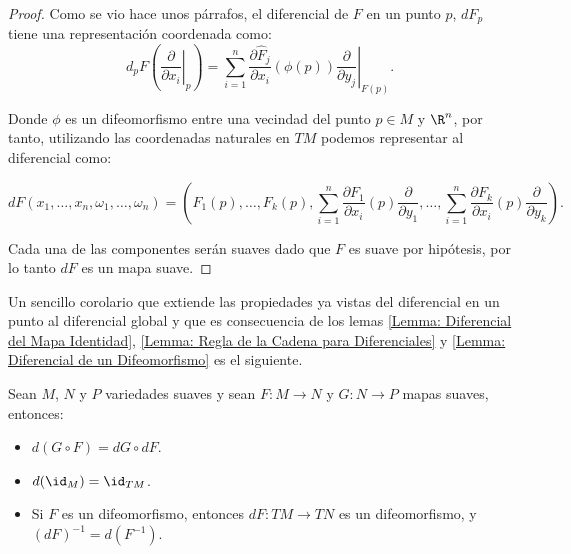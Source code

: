 \begin{proof}
	Como se vio hace unos párrafos, el diferencial de $F$ en un punto $p$, $dF_p$ tiene una representación coordenada como:
	\[
		d_{p}F \left( \left. \frac{\partial}{\partial x_i} \right|_{p}\right)
		=
		\sum_{i=1}^{n} \frac{\partial \hat{F}_j}{\partial x_i} (\phi(p)) \left. \frac{\partial}{\partial y_j} \right|_{F(p)}.
	\]

	Donde $\phi$ es un difeomorfismo entre una vecindad del punto $p \in M$ y $\R^n$, por tanto, utilizando las coordenadas naturales en $TM$ podemos representar al diferencial como:

	\[
		dF(x_1, \dots, x_n, \omega_1, \dots, \omega_n) =
		\left(
		F_1(p), \dots, F_k(p), \sum_{i=1}^{n} \frac{\partial F_1}{\partial x_i}(p) \frac{\partial}{\partial y_1}, \dots, \sum_{i=1}^{n} \frac{\partial F_k}{\partial x_i} (p)\frac{\partial}{\partial y_k}
		\right).
	\]

	Cada una de las componentes serán suaves dado que $F$ es suave por hipótesis, por lo tanto $dF$ es un mapa suave.
\end{proof}

Un sencillo corolario que extiende las propiedades ya vistas del diferencial en un punto al diferencial global y que es consecuencia de los lemas \ref{Lemma: Diferencial del Mapa Identidad}, \ref{Lemma: Regla de la Cadena para Diferenciales} y \ref{Lemma: Diferencial de un Difeomorfismo} es el siguiente.

\begin{corollary}\label{Corolario: Propiedades de los diferenciales}
	Sean $M$, $N$ y $P$ variedades suaves y sean $F: M \to N$ y $G: N \to P$ mapas suaves, entonces:
	\begin{itemize}
		\item $d(G \circ F) = dG \circ dF$.
		\item $d(\id_M) = \id_{TM}$.
		\item Si $F$ es un difeomorfismo, entonces $dF: TM \to TN$ es un difeomorfismo, y $(dF)^{-1} = d(F^{-1})$.
	\end{itemize}
\end{corollary}
